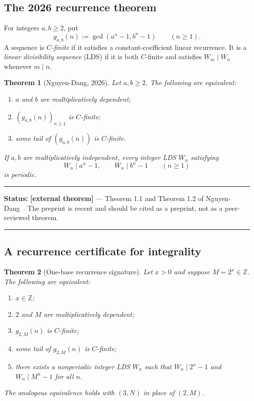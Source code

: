 \documentclass[11pt,oneside]{article}
\newtheorem{theorem}{Theorem}[section]
\theoremstyle{definition}
\theoremstyle{remark}
\newcommand{\Z}{\mathbb Z}
\newcommand{\statusexternal}{\textcolor{deepblue}{\textbf{[external theorem]}}}
\newenvironment{statusbox}[1]
{\begin{center}\begin{minipage}{0.94\textwidth}\hrule\vspace{0.45em}\textbf{Status:} #1\par\vspace{0.35em}}
{\vspace{0.35em}\hrule\end{minipage}\end{center}}
\begin{document}
\subsection{The 2026 recurrence theorem}

For integers $a,b\ge2$, put
\[
 g_{a,b}(n):=\gcd(a^n-1,b^n-1)\qquad(n\ge1).
\]
A sequence is \emph{$C$-finite} if it satisfies a constant-coefficient linear recurrence.
It is a \emph{linear divisibility sequence} (LDS) if it is both $C$-finite and satisfies
$W_m\mid W_n$ whenever $m\mid n$.

\begin{theorem}[Nguyen-Dang, 2026]
\label{thm:ND}
Let $a,b\ge2$.  The following are equivalent:
\begin{enumerate}[label=\textup{(\alph*)}]
\item $a$ and $b$ are multiplicatively dependent;
\item $(g_{a,b}(n))_{n\ge1}$ is $C$-finite;
\item some tail of $(g_{a,b}(n))$ is $C$-finite.
\end{enumerate}
If $a,b$ are multiplicatively independent, every integer LDS $W_n$ satisfying
\[
 W_n\mid a^n-1,\qquad W_n\mid b^n-1\qquad(n\ge1)
\]
is periodic.
\end{theorem}

\begin{statusbox}{\statusexternal{} --- Theorem 1.1 and Theorem 1.2 of
Nguyen-Dang~\cite{NguyenDang2026}.  The preprint is recent and should be cited as a preprint,
not as a peer-reviewed theorem.}
\end{statusbox}

\subsection{A recurrence certificate for integrality}

\begin{theorem}[One-base recurrence signature]
\label{thm:onebase-signature}
Let $x>0$ and suppose $M=2^x\in\Z$.  The following are equivalent:
\begin{enumerate}[label=\textup{(\roman*)}]
\item $x\in\Z$;
\item $2$ and $M$ are multiplicatively dependent;
\item $g_{2,M}(n)$ is $C$-finite;
\item some tail of $g_{2,M}(n)$ is $C$-finite;
\item there exists a nonperiodic integer LDS $W_n$ such that
$W_n\mid2^n-1$ and $W_n\mid M^n-1$ for all $n$.
\end{enumerate}
The analogous equivalence holds with $(3,N)$ in place of $(2,M)$.
\end{theorem}
\end{document}
